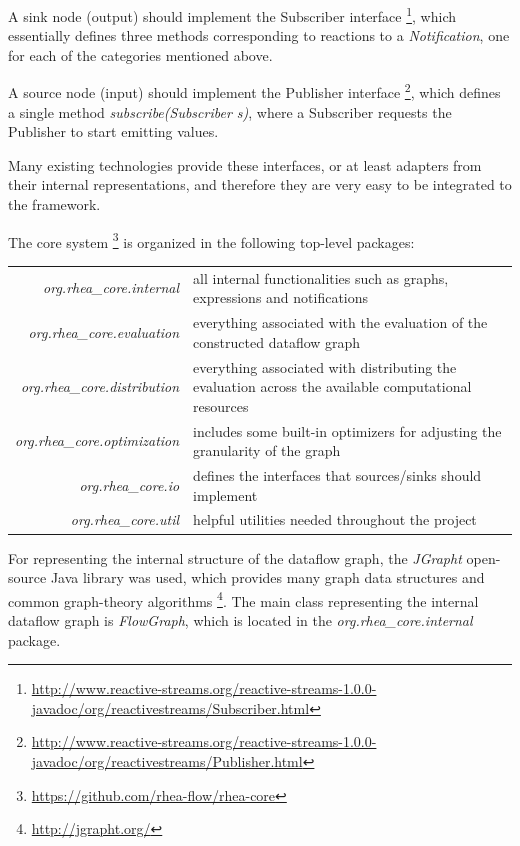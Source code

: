 \documentclass{dithesis}
\begin{document}
A sink node (output) should implement the Subscriber interface \footnote{\url{http://www.reactive-streams.org/reactive-streams-1.0.0-javadoc/org/reactivestreams/Subscriber.html}}, which essentially defines three methods corresponding to reactions to a \textit{Notification}, one for each of the categories mentioned above. 

A source node (input) should implement the Publisher interface \footnote{\url{http://www.reactive-streams.org/reactive-streams-1.0.0-javadoc/org/reactivestreams/Publisher.html}}, which defines a single method \textit{subscribe(Subscriber s)}, where a Subscriber requests the Publisher to start emitting values. 

Many existing technologies provide these interfaces, or at least adapters from their internal representations, and therefore they are very easy to be integrated to the framework.

\newpage

The core system \footnote{\url{https://github.com/rhea-flow/rhea-core}} is organized in the following top-level packages:

\begin{tabularx}{\textwidth}{rX}
	\textit{org.rhea\_core.internal} 
	& all internal functionalities such as graphs, expressions and notifications \\
	\textit{org.rhea\_core.evaluation}
	& everything associated with the evaluation of the constructed dataflow graph \\
	\textit{org.rhea\_core.distribution}
	& everything associated with distributing the evaluation across the available computational resources \\
	\textit{org.rhea\_core.optimization}	
	& includes some built-in optimizers for adjusting the  granularity of the graph \\
	\textit{org.rhea\_core.io}
	& defines the interfaces that sources/sinks should implement \\
	\textit{org.rhea\_core.util}
	& helpful utilities needed throughout the project \\
\end{tabularx}


For representing the internal structure of the dataflow graph, the \textit{JGrapht} open-source Java library was used, which provides many graph data structures and common graph-theory algorithms \footnote{\url{http://jgrapht.org/}}. The main class representing the internal dataflow graph is \textit{FlowGraph},  which is located in the \textit{org.rhea\_core.internal} package.
\end{document}
